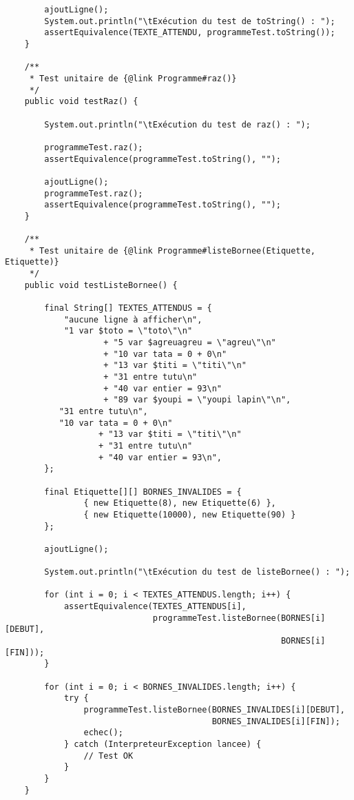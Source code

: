 \begin{enum}
\begin{verbatim}
        ajoutLigne();
        System.out.println("\tExécution du test de toString() : ");
        assertEquivalence(TEXTE_ATTENDU, programmeTest.toString());
    }
    
    /** 
     * Test unitaire de {@link Programme#raz()}
     */
    public void testRaz() {
        
        System.out.println("\tExécution du test de raz() : ");
        
        programmeTest.raz();
        assertEquivalence(programmeTest.toString(), "");
        
        ajoutLigne();
        programmeTest.raz();
        assertEquivalence(programmeTest.toString(), "");
    }
   
    /** 
     * Test unitaire de {@link Programme#listeBornee(Etiquette, Etiquette)}
     */
    public void testListeBornee() {
        
        final String[] TEXTES_ATTENDUS = {
            "aucune ligne à afficher\n",
            "1 var $toto = \"toto\"\n"
                    + "5 var $agreuagreu = \"agreu\"\n"
                    + "10 var tata = 0 + 0\n"
                    + "13 var $titi = \"titi\"\n"
                    + "31 entre tutu\n"
                    + "40 var entier = 93\n"
                    + "89 var $youpi = \"youpi lapin\"\n",
           "31 entre tutu\n",
           "10 var tata = 0 + 0\n"
                   + "13 var $titi = \"titi\"\n"
                   + "31 entre tutu\n"
                   + "40 var entier = 93\n",
        };
        
        final Etiquette[][] BORNES_INVALIDES = {
                { new Etiquette(8), new Etiquette(6) },
                { new Etiquette(10000), new Etiquette(90) }
        };
        
        ajoutLigne();
        
        System.out.println("\tExécution du test de listeBornee() : ");
        
        for (int i = 0; i < TEXTES_ATTENDUS.length; i++) {
            assertEquivalence(TEXTES_ATTENDUS[i], 
                              programmeTest.listeBornee(BORNES[i][DEBUT], 
                                                        BORNES[i][FIN]));
        }
        
        for (int i = 0; i < BORNES_INVALIDES.length; i++) {
            try {
                programmeTest.listeBornee(BORNES_INVALIDES[i][DEBUT], 
                                          BORNES_INVALIDES[i][FIN]);
                echec();
            } catch (InterpreteurException lancee) {
                // Test OK
            }
        }
    }
    

\end{verbatim}
\end{enum}
